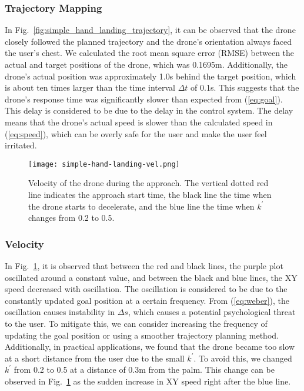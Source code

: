 \subsubsection{Trajectory Mapping}
In Fig.~\ref{fig:simple_hand_landing_trajectory}, it can be observed that the drone closely followed the planned trajectory and the drone's orientation always faced the user's chest.
We calculated the root mean square error (RMSE) between the actual and target positions of the drone, which was 0.1695m.
Additionally, the drone's actual position was approximately 1.0s behind the target position,
which is about ten times larger than the time interval $\Delta t$ of 0.1s.
This suggests that the drone's response time was significantly slower than expected from (\ref{eq:goal}).
This delay is considered to be due to the delay in the control system.
The delay means that the drone's actual speed is slower than the calculated speed in (\ref{eq:speed}), which can be overly safe for the user and make the user feel irritated.

\begin{figure}
  \centering
  \texttt{[image: simple-hand-landing-vel.png]}
  \caption{Velocity of the drone during the approach. 
  The vertical dotted red line indicates the approach start time, 
  the black line the time when the drone starts to decelerate, 
  and the blue line the time when $k^\prime$ changes from 0.2 to 0.5.}
  \label{fig:simple_hand_landing_vel}
\end{figure}
\subsubsection{Velocity}
In Fig.~\ref{fig:simple_hand_landing_vel},
it is observed that between the red and black lines, the purple plot oscillated around a constant value, and between the black and blue lines, the XY speed decreased with oscillation.
The oscillation is considered to be due to the constantly updated goal position at a certain frequency.
From (\ref{eq:weber}), the oscillation causes instability in $\Delta s$,
which causes a potential psychological threat to the user.
To mitigate this, we can consider increasing the frequency of updating the goal position or using a smoother trajectory planning method.
Additionally, in practical applications, we found that the drone became too slow at a short distance from the user due to the small $k^\prime$.
To avoid this, we changed $k^\prime$ from 0.2 to 0.5 at a distance of 0.3m from the palm.
This change can be observed in Fig.~\ref{fig:simple_hand_landing_vel} as the sudden increase in XY speed right after the blue line.

